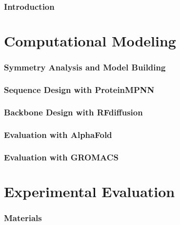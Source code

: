 \documentclass[12pt]{article}
\begin{document}
\tableofcontents
\clearpage

\section{Introduction}\label{ch:introduction}

\FloatBarrier

% 

\part{Computational Modeling}
\section{Symmetry Analysis and Model Building}\label{ch:symmetry}

\FloatBarrier

\section{Sequence Design with ProteinMPNN}\label{ch:pmpnn}

\FloatBarrier

\section{Backbone Design with RFdiffusion}\label{ch:rfdiffusion}

\FloatBarrier

\section{Evaluation with AlphaFold}\label{ch:alphafold}

\FloatBarrier

\section{Evaluation with GROMACS}\label{ch:gromacs}

\FloatBarrier

\part{Experimental Evaluation}
\section{Materials}\label{ch:materials}

\end{document}
